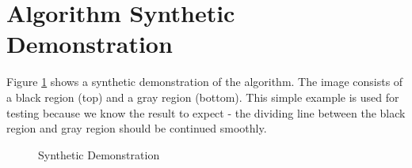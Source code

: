 \documentclass{InsightArticle}
\begin{document}
\section{Algorithm Synthetic Demonstration}
Figure \ref{fig:SyntheticDemonstration} shows a synthetic demonstration of the algorithm. The image consists of a black region (top) and a gray region (bottom).  This simple example is used for testing because we know the result to expect - the dividing line between the black region and gray region should be continued smoothly.

\begin{figure}[H]
\centering
{}
\caption{Synthetic Demonstration}
\label{fig:SyntheticDemonstration}
\end{figure}
\end{document}
